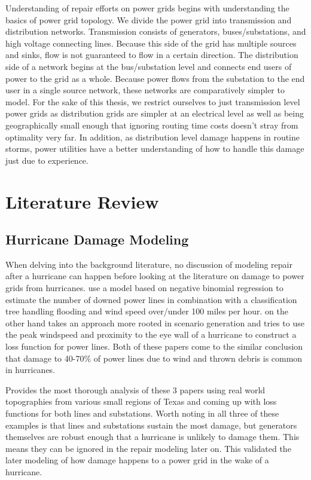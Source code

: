 \documentclass{article}
\begin{document}
	Understanding of repair efforts on power grids begins with understanding the basics of power grid topology. We divide the power grid into transmission and distribution networks. Transmission consists of generators, buses/substations, and high voltage connecting lines. Because this side of the grid has multiple sources and sinks, flow is not guaranteed to flow in a certain direction. The distribution side of a network begins at the bus/substation level and connects end users of power to the grid as a whole. Because power flows from the substation to the end user in a single source network, these networks are comparatively simpler to model. For the sake of this thesis, we restrict ourselves to just transmission level power grids as distribution grids are simpler at an electrical level as well as being geographically small enough that ignoring routing time costs doesn't stray from optimality very far. In addition, as distribution level damage happens in routine storms, power utilities have a better understanding of how to handle this damage just due to experience.
	
	
	\section{Literature Review}
	\subsection{Hurricane Damage Modeling}
		When delving into the background literature, no discussion of modeling repair after a hurricane can happen before looking at the literature on damage to power grids from hurricanes. \cite{GuikemaEA2010} use a model based on negative binomial regression to estimate the number of downed power lines in combination with a classification tree handling flooding and wind speed over/under 100 miles per hour. \cite{ScherbEA2015} on the other hand takes an approach more rooted in scenario generation and tries to use the peak windspeed and proximity to the eye wall of a hurricane to construct a loss function for power lines. Both of these papers come to the similar conclusion that damage to 40-70\% of power lines due to wind and thrown debris is common in hurricanes.
		
		 \cite{WinklerEA2010} Provides the most thorough analysis of these 3 papers using real world topographies from various small regions of Texas and coming up with loss functions for both lines and substations. Worth noting in all three of these examples is that lines and substations sustain the most damage, but generators themselves are robust enough that a hurricane is unlikely to damage them. This means they can be ignored in the repair modeling later on. This validated the later modeling of how damage happens to a power grid in the wake of a hurricane.
\end{document}
